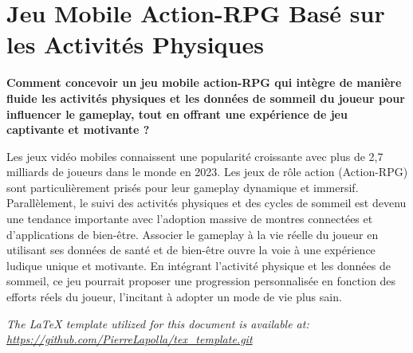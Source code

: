 \maketitle

\section*{Jeu Mobile Action-RPG Basé sur les Activités Physiques}\label{sec:sujet}
\textbf
{Comment concevoir un jeu mobile action-RPG qui intègre de manière fluide les activités physiques et les données de
sommeil du joueur pour influencer le gameplay, tout en offrant une expérience de jeu captivante et motivante ? }

Les jeux vidéo mobiles connaissent une popularité croissante avec plus de 2,7 milliards de joueurs dans le monde en
2023.
Les jeux de rôle action (Action-RPG) sont particulièrement prisés pour leur gameplay dynamique et immersif.
Parallèlement, le suivi des activités physiques et des cycles de sommeil est devenu une tendance importante avec
l'adoption massive de montres connectées et d'applications de bien-être.
Associer le gameplay à la vie réelle du joueur en utilisant ses données de santé et de bien-être ouvre la voie à une
expérience ludique unique et motivante.
En intégrant l’activité physique et les données de sommeil, ce jeu pourrait proposer une progression personnalisée en
fonction des efforts réels du joueur, l’incitant à adopter un mode de vie plus sain.

\tableofcontents

\vfill
\begin{center}
    \textit{The \LaTeX{} template utilized for this document is available at:
    \url{https://github.com/PierreLapolla/tex_template.git}}
\end{center}
\newpage

\cite{*}